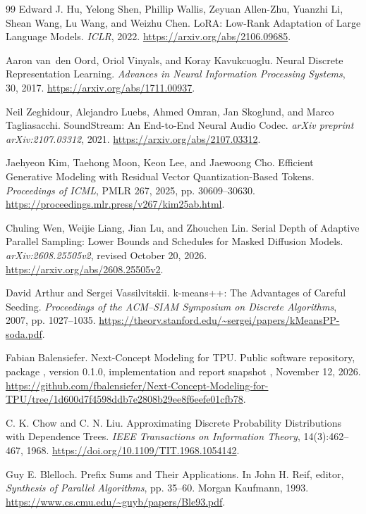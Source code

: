 \begin{thebibliography}{99}
Edward J. Hu, Yelong Shen, Phillip Wallis, Zeyuan Allen-Zhu, Yuanzhi Li,
Shean Wang, Lu Wang, and Weizhu Chen.
\newblock LoRA: Low-Rank Adaptation of Large Language Models.
\newblock \emph{ICLR}, 2022. \url{https://arxiv.org/abs/2106.09685}.

Aaron van~den Oord, Oriol Vinyals, and Koray Kavukcuoglu.
\newblock Neural Discrete Representation Learning.
\newblock \emph{Advances in Neural Information Processing Systems}, 30, 2017.
\newblock \url{https://arxiv.org/abs/1711.00937}.

Neil Zeghidour, Alejandro Luebs, Ahmed Omran, Jan Skoglund, and Marco
Tagliasacchi.
\newblock SoundStream: An End-to-End Neural Audio Codec.
\newblock \emph{arXiv preprint arXiv:2107.03312}, 2021.
\newblock \url{https://arxiv.org/abs/2107.03312}.

Jaehyeon Kim, Taehong Moon, Keon Lee, and Jaewoong Cho.
\newblock Efficient Generative Modeling with Residual Vector Quantization-Based Tokens.
\newblock \emph{Proceedings of ICML}, PMLR 267, 2025, pp. 30609--30630.
\newblock \url{https://proceedings.mlr.press/v267/kim25ab.html}.

Chuling Wen, Weijie Liang, Jian Lu, and Zhouchen Lin.
\newblock Serial Depth of Adaptive Parallel Sampling: Lower Bounds and Schedules for Masked Diffusion Models.
\newblock \emph{arXiv:2608.25505v2}, revised October 20, 2026.
\newblock \url{https://arxiv.org/abs/2608.25505v2}.

David Arthur and Sergei Vassilvitskii.
\newblock k-means++: The Advantages of Careful Seeding.
\newblock \emph{Proceedings of the ACM--SIAM Symposium on Discrete Algorithms}, 2007, pp. 1027--1035.
\newblock \url{https://theory.stanford.edu/~sergei/papers/kMeansPP-soda.pdf}.

Fabian Balensiefer.
\newblock Next-Concept Modeling for TPU.
\newblock Public software repository, package , version 0.1.0,
implementation and report snapshot , November 12, 2026.
\newblock \url{https://github.com/fbalensiefer/Next-Concept-Modeling-for-TPU/tree/1d600d7f4598ddb7e2808b29ee8f6eefe01cfb78}.

C. K. Chow and C. N. Liu.
\newblock Approximating Discrete Probability Distributions with Dependence Trees.
\newblock \emph{IEEE Transactions on Information Theory}, 14(3):462--467, 1968.
\newblock \url{https://doi.org/10.1109/TIT.1968.1054142}.

Guy E. Blelloch.
\newblock Prefix Sums and Their Applications.
\newblock In John H. Reif, editor, \emph{Synthesis of Parallel Algorithms}, pp. 35--60.
Morgan Kaufmann, 1993.
\newblock \url{https://www.cs.cmu.edu/~guyb/papers/Ble93.pdf}.
\end{thebibliography}
\endgroup

